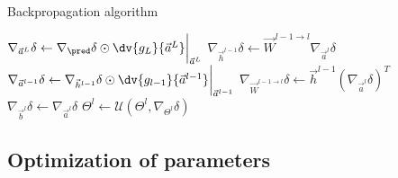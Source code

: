         \begin{algorithm}
            \caption{Backpropagation algorithm}
            \label{alg:ML:NN:backpropagation}
            \begin{algorithmic}[1]
                \State $\nabla_{\vec{a}^L}\delta \leftarrow \nabla_{\pred}\delta \odot \dv{g_L}{\vec{a}^L}\bigg|_{\vec{a}^L}$
                    \State $\nabla_{\vec{h}^{l-1}}\delta \leftarrow \vec{W}^{l-1\to l}\nabla_{\vec{a}^l}\delta$
                    \State $\nabla_{\vec{a}^{l-1}}\delta \leftarrow \nabla_{\vec{h}^{l-1}}\delta \odot \dv{g_{l-1}}{\vec{a}^{l-1}}\bigg|_{\vec{a}^{l-1}}$
                    \State $\nabla_{\vec{W}^{l-1\to l}}\delta \leftarrow \vec{h}^{l-1}(\nabla_{\vec{a}^l}\delta)^T$
                    \State $\nabla_{\vec{b}^l}\delta \leftarrow \nabla_{\vec{a}^l}\delta$
                    \State $\Theta^l \leftarrow \mathcal{U}(\Theta^l, \nabla_{\Theta^l}\delta)$
                \EndFor
            \end{algorithmic}
        \end{algorithm}

    \subsection{Optimization of parameters}
